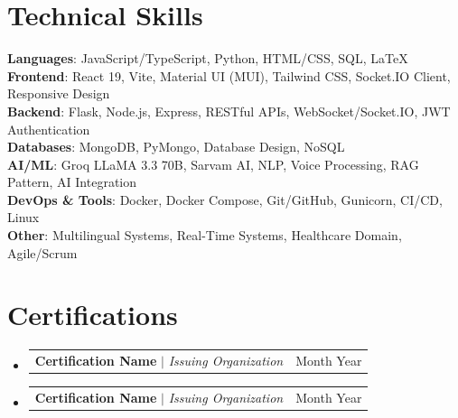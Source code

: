 \documentclass[letterpaper,11pt]{article}
\makeatletter
\newcommand{\resumeProjectHeading}[2]{
    \item
    \begin{tabular*}{0.97\textwidth}{l@{\extracolsep{\fill}}r}
      \small#1 & #2 \\
    \end{tabular*}\vspace{-7pt}
}
\newcommand{\resumeSubHeadingListStart}{\begin{itemize}[leftmargin=0.15in, label={}]}
\newcommand{\resumeSubHeadingListEnd}{\end{itemize}}
\makeatother
\begin{document}
\section{Technical Skills}
 \begin{itemize}[leftmargin=0.15in, label={}]
    \small{\item{
     \textbf{Languages}{: JavaScript/TypeScript, Python, HTML/CSS, SQL, LaTeX} \\
     \textbf{Frontend}{: React 19, Vite, Material UI (MUI), Tailwind CSS, Socket.IO Client, Responsive Design} \\
     \textbf{Backend}{: Flask, Node.js, Express, RESTful APIs, WebSocket/Socket.IO, JWT Authentication} \\
     \textbf{Databases}{: MongoDB, PyMongo, Database Design, NoSQL} \\
     \textbf{AI/ML}{: Groq LLaMA 3.3 70B, Sarvam AI, NLP, Voice Processing, RAG Pattern, AI Integration} \\
     \textbf{DevOps \& Tools}{: Docker, Docker Compose, Git/GitHub, Gunicorn, CI/CD, Linux} \\
     \textbf{Other}{: Multilingual Systems, Real-Time Systems, Healthcare Domain, Agile/Scrum}
    }}
 \end{itemize}

\section{Certifications}
 \resumeSubHeadingListStart
   \resumeProjectHeading
       {\textbf{Certification Name} $|$ \emph{Issuing Organization}}{Month Year}
   \resumeProjectHeading
       {\textbf{Certification Name} $|$ \emph{Issuing Organization}}{Month Year}
 \resumeSubHeadingListEnd

\end{document}
